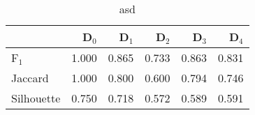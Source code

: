 \begin{table}
\centering
\caption{asd}
\label{tab:s1-cont-eca-single}
\begin{tabular}{lrrrrr}
\toprule
{} &  D$_0$ &  D$_1$ &  D$_2$ &  D$_3$ &  D$_4$ \\
\midrule
F$_1$      &  1.000 &  0.865 &  0.733 &  0.863 &  0.831 \\
Jaccard    &  1.000 &  0.800 &  0.600 &  0.794 &  0.746 \\
Silhouette &  0.750 &  0.718 &  0.572 &  0.589 &  0.591 \\
\bottomrule
\end{tabular}
\end{table}
